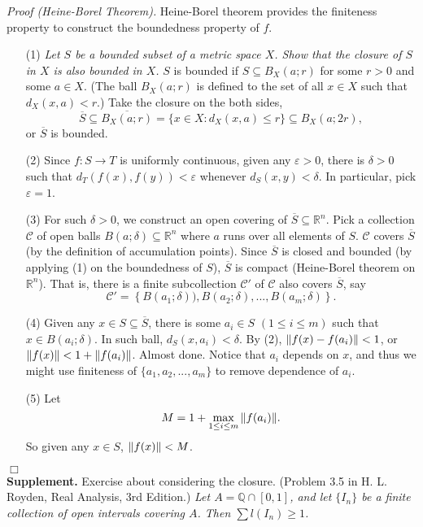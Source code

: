 \documentclass{article}
\begin{document}
\emph{Proof (Heine-Borel Theorem).}
Heine-Borel theorem provides the finiteness property to construct
the boundedness property of $f$.
\begin{enumerate}
\item[(1)]
\emph{Let $S$ be a bounded subset of a metric space $X$.
Show that the closure of $S$ in $X$ is also bounded in $X$.}
$S$ is bounded if $S \subseteq B_X(a;r)$ for some $r > 0$ and some $a \in X$.
(The ball $B_X(a;r)$ is defined to the set of all $x \in X$ such that
$d_X(x, a) < r$.)
Take the closure on the both sides,
$$\overline{S}
\subseteq \overline{B_X(a;r)}
= \{ x \in X : d_X(x, a) \leq r \}
\subseteq B_X(a;2r),$$
or $\overline{S}$ is bounded.
\item[(2)]
Since $f: S \rightarrow T$ is uniformly continuous,
given any $\varepsilon > 0$, there is $\delta > 0$ such that
$d_T(f(x), f(y)) < \varepsilon$ whenever $d_S(x, y) < \delta$.
In particular, pick $\varepsilon = 1$.
\item[(3)]
For such $\delta > 0$, we construct an open covering of $\overline{S} \subseteq \mathbb{R}^n$.
Pick a collection $\mathscr{C}$ of open balls
$B(a;\delta) \subseteq \mathbb{R}^n$
where $a$ runs over all elements of $S$.
$\mathscr{C}$ covers $\overline{S}$ (by the definition of accumulation points).
Since $\overline{S} $ is closed and bounded (by applying (1) on the boundedness of $S$),
$\overline{S}$ is compact
(Heine-Borel theorem on $\mathbb{R}^n$).
That is, there is a finite subcollection $\mathscr{C}'$ of $\mathscr{C}$
also covers $\overline{S}$, say
$$\mathscr{C}'
= \left\{B(a_1;\delta)), B(a_2;\delta), ..., B(a_m;\delta) \right\}.$$
\item[(4)]
Given any $x \in S \subseteq \overline{S}$,
there is some $a_i \in S$ $(1 \leq i \leq m)$ such that $x \in B(a_i;\delta)$.
In such ball, $d_S(x, a_i) < \delta$.
By (2), $\norm{f(x) - f(a_i)} < 1$,
or $\norm{f(x)} < 1 + \norm{f(a_i)}$.
Almost done.
Notice that $a_i$ depends on $x$,
and thus we might use finiteness of $\{ a_1, a_2, ..., a_m \}$
to remove dependence of $a_i$.
\item[(5)]
Let
$$M = 1 + \max_{1 \leq i \leq m}{\norm{f(a_i)}}.$$
So given any $x \in S$, $\norm{f(x)} < M$.
\end{enumerate}
$\Box$ \\

\textbf{Supplement.}
Exercise about considering the closure.
(Problem 3.5 in H. L. Royden, Real Analysis, 3rd Edition.)
\emph{Let $A = \mathbb{Q} \cap [0,1]$,
and let $\{ I_n\}$ be a finite collection of open intervals covering $A$.
Then $\sum l(I_n) \geq 1$.} \\
\end{document}

